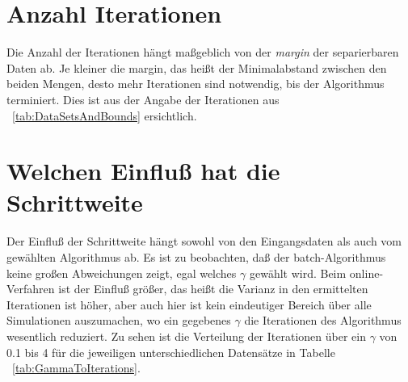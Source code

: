 \documentclass[]{report}
\begin{document}
\section{Anzahl Iterationen}

Die Anzahl der Iterationen h\"angt ma{\ss}geblich von der \emph{margin} der separierbaren Daten ab. Je kleiner die margin, das hei{\ss}t der Minimalabstand zwischen den beiden Mengen, desto mehr Iterationen sind notwendig, bis der Algorithmus terminiert. Dies ist aus der Angabe der Iterationen aus ~\ref{tab:DataSetsAndBounds} ersichtlich.


\section{Welchen Einflu{\ss} hat die Schrittweite}

Der Einflu{\ss} der Schrittweite h\"angt sowohl von den Eingangsdaten als auch vom gew\"ahlten Algorithmus ab.
Es ist zu beobachten, da{\ss} der batch-Algorithmus keine gro{\ss}en Abweichungen zeigt, egal welches $\gamma$ gew\"ahlt wird. Beim online-Verfahren ist der Einflu{\ss} gr\"o{\ss}er, das hei{\ss}t die Varianz in den ermittelten Iterationen ist h\"oher, aber auch hier ist kein eindeutiger Bereich \"uber alle Simulationen auszumachen, wo ein gegebenes $\gamma$ die Iterationen des Algorithmus wesentlich reduziert. Zu sehen ist die Verteilung der Iterationen \"uber ein $\gamma$ von 0.1 bis 4 f\"ur die jeweiligen unterschiedlichen Datens\"atze in Tabelle ~\ref{tab:GammaToIterations}.
\end{document}
